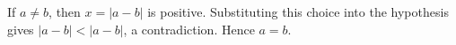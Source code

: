 If $a\ne b$, then $x=|a-b|$ is positive. Substituting this choice into the hypothesis gives $|a-b|<|a-b|$, a contradiction. Hence $\boxed{a=b}$.
